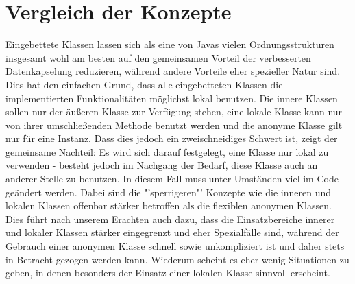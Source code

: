 \section{Vergleich der Konzepte}

Eingebettete Klassen lassen sich als eine von Javas vielen Ordnungsstrukturen insgesamt wohl am besten auf den gemeinsamen Vorteil der verbesserten Datenkapselung reduzieren, während andere Vorteile eher spezieller Natur sind.
Dies hat den einfachen Grund, dass alle eingebetteten Klassen die implementierten Funktionalitäten möglichst lokal benutzen. Die innere Klassen sollen nur der äußeren Klasse zur Verfügung stehen,
eine lokale Klasse kann nur von ihrer umschließenden Methode benutzt werden und die anonyme Klasse gilt nur für eine Instanz. Dass dies jedoch ein zweischneidiges Schwert ist, zeigt der gemeinsame Nachteil:
Es wird sich darauf festgelegt, eine Klasse nur lokal zu verwenden - besteht jedoch im Nachgang der Bedarf, diese Klasse auch an anderer Stelle zu benutzen. In diesem Fall muss unter Umständen viel im Code geändert werden.
Dabei sind die "'sperrigeren"' Konzepte wie die inneren und lokalen Klassen offenbar stärker betroffen als die flexiblen anonymen Klassen.
Dies führt nach unserem Erachten auch dazu, dass die Einsatzbereiche innerer und lokaler Klassen stärker eingegrenzt und eher Spezialfälle sind, während der Gebrauch einer anonymen Klasse
schnell sowie unkompliziert ist und daher stets in Betracht gezogen werden kann. Wiederum scheint es eher wenig Situationen zu geben, in denen besonders der Einsatz einer lokalen Klasse sinnvoll erscheint.
